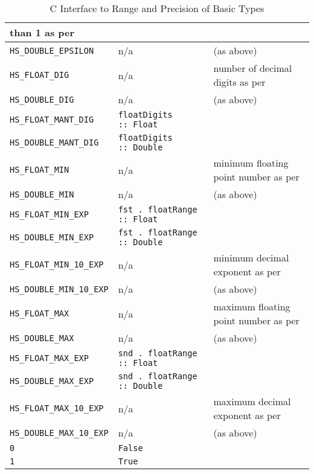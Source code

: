 \documentclass[a4paper,twoside]{article}
\newcommand{\code}[1]{\texttt{#1}}      %
\begin{document}
\begin{table}
\begin{center}
\begin{tabular}{|l|l|p{30ex}|}
      than 1 as per~\cite{C99}\\
      \hline
      \code{HS\_DOUBLE\_EPSILON} & n/a
      & (as above)\\
      \hline
      \code{HS\_FLOAT\_DIG} & n/a
      & number of decimal digits as per~\cite{C99}\\
      \hline
      \code{HS\_DOUBLE\_DIG} & n/a
      & (as above)\\
      \hline
      \code{HS\_FLOAT\_MANT\_DIG} & \code{floatDigits ::\ Float}
      & \\
      \hline
      \code{HS\_DOUBLE\_MANT\_DIG} & \code{floatDigits ::\ Double}
      & \\
      \hline
      \code{HS\_FLOAT\_MIN} & n/a
      & minimum floating point number as per~\cite{C99}\\
      \hline
      \code{HS\_DOUBLE\_MIN} & n/a
      & (as above)\\
      \hline
      \code{HS\_FLOAT\_MIN\_EXP} & \code{fst .\ floatRange ::\ Float}
      & \\
      \hline
      \code{HS\_DOUBLE\_MIN\_EXP} & \code{fst .\ floatRange ::\ Double}
      & \\
      \hline
      \code{HS\_FLOAT\_MIN\_10\_EXP} & n/a
      & minimum decimal exponent as per~\cite{C99}\\
      \hline
      \code{HS\_DOUBLE\_MIN\_10\_EXP} & n/a
      & (as above)\\
      \hline
      \code{HS\_FLOAT\_MAX} & n/a
      & maximum floating point number as per~\cite{C99}\\
      \hline
      \code{HS\_DOUBLE\_MAX} & n/a
      & (as above)\\
      \hline
      \code{HS\_FLOAT\_MAX\_EXP} & \code{snd .\ floatRange ::\ Float}
      & \\
      \hline
      \code{HS\_DOUBLE\_MAX\_EXP} & \code{snd .\ floatRange ::\ Double}
      & \\
      \hline
      \code{HS\_FLOAT\_MAX\_10\_EXP} & n/a
      & maximum decimal exponent as per~\cite{C99}\\
      \hline
      \code{HS\_DOUBLE\_MAX\_10\_EXP} & n/a
      & (as above)\\
      \hline
      \code{0} & \code{False}
      & \\
      \hline
      \code{1} & \code{True}
      & \\
      \hline
    \end{tabular}
    \caption{C Interface to Range and Precision of Basic Types}
    \label{tab:c-haskell-values}
  \end{center}
\end{table}
\end{document}
